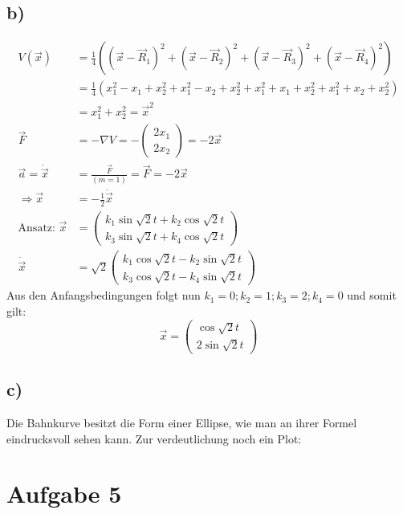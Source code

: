 \documentclass[12pt,a4paper,notitlepage]{article}
\newcommand{\aufgabe}[1]{\section*{\setcounter{section}{#1}Aufgabe #1}}
\begin{document}
\subsection*{b)}
\begin{align}
V(\vec x)&=\frac{1}{4}\left((\vec x-\vec R_1)^2+(\vec x-\vec R_2)^2+(\vec x-\vec R_3)^2+(\vec x-\vec R_4)^2\right)\\
&=\frac{1}{4}\left(x_1^2-x_1+x_2^2+x_1^2-x_2+x_2^2+x_1^2+x_1+x_2^2+x_1^2+x_2+x_2^2\right)\\
&=x_1^2+x_2^2=\vec x^2\\
\vec F&=-\nabla V=-\left(\begin{matrix}2x_1\\2x_2\end{matrix}\right)=-2\vec x\\
\vec a=\ddot{\vec x}&=\frac{\vec F}{(m=1)}=\vec F=-2\vec x\\
\Rightarrow\vec x&=-\frac{1}{2}\ddot{\vec x}\\
\text{Ansatz: }\vec x&=\left(\begin{matrix}
k_1\sin\sqrt2t+k_2\cos\sqrt2t\\
k_3\sin\sqrt2t+k_4\cos\sqrt2t
\end{matrix}\right)\\
\dot{\vec x}&=\sqrt2\left(\begin{matrix}
k_1\cos\sqrt2t-k_2\sin\sqrt2t\\
k_3\cos\sqrt2t-k_4\sin\sqrt2t
\end{matrix}\right)
\end{align}
Aus den Anfangsbedingungen folgt nun $k_1=0; k_2=1; k_3=2; k_4=0$ und somit gilt:
\begin{equation}
\vec x=\left(\begin{matrix}
\cos\sqrt2t\\
2\sin\sqrt2t
\end{matrix}\right)
\end{equation}
\subsection*{c)}
Die Bahnkurve besitzt die Form einer Ellipse, wie man an ihrer Formel eindrucksvoll sehen kann. Zur verdeutlichung noch ein Plot:
\aufgabe{5}
\end{document}
